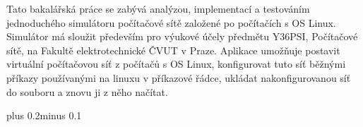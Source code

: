 \documentclass[11pt,twoside,a4paper]{book}
\begin{document}

\baselineskip

\noindent
Tato bakalářská práce se zabývá analýzou, implementací a testováním jednoduchého simulátoru počítačové sítě založené po počítačích s OS Linux. Simulátor má sloužit především pro výukové účely předmětu Y36PSI, Počítačové sítě, na Fakultě elektrotechnické ČVUT v Praze. Aplikace umožňuje postavit virtuální počítačovou síť z počítačů s OS Linux, konfigurovat tuto síť běžnými příkazy používanými na linuxu v příkazové řádce, ukládat nakonfigurovanou síť do souboru a znovu ji z něho načítat.



\tableofcontents



\listoffigures




\mainbodystarts
\normalfont
{}\baselineskip plus 0.2\baselineskip minus 0.1\baselineskip















\end{document}
